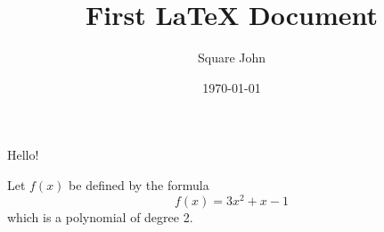 \documentclass{article}
\title{First LaTeX Document} %
\author{Square John} %
\date{\today} %
\begin{document}
	
	\maketitle %
	
	Hello!
	
	
	Let $ f(x) $ be defined by the formula %
	$$ f(x) = 3x^2 + x-1 $$  %
		which is a polynomial of degree 2. %
	
\end{document}
